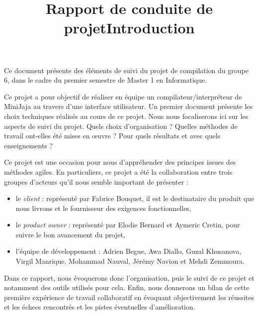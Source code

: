 \documentclass[a4paper,12pt]{article}
\title{Rapport de conduite de projet\linebreak Introduction}
\begin{document}
\maketitle

Ce document présente des éléments de suivi du projet de compilation du groupe 6, dans le cadre du premier semestre de Master 1 en Informatique. 

Ce projet a pour objectif de réaliser en équipe un compilateur/interpréteur de MiniJaja au travers d'une interface utilisateur. Un premier document présente les choix techniques réalisés au cours de ce projet. Nous nous focaliserons ici sur les aspects de suivi du projet. Quels choix d'organisation ? Quelles méthodes de travail ont-elles été mises en œuvre ? Pour quels résultats et avec quels enseignements ?

Ce projet est une occasion pour nous d'appréhender des principes issues des méthodes agiles. En particuliers, ce projet a été la collaboration entre trois groupes d'acteurs qu'il nous semble important de présenter :
\begin{itemize}
\item le \emph{client} : représenté par Fabrice Bouquet, il est le destinataire du produit que nous livrons et le fournisseur des exigences fonctionnelles,
\item le \emph{product owner} : représenté par Elodie Bernard et Aymeric Cretin, pour suivre le bon avancement du projet,
\item l'équipe de développement : Adrien Begue, Awa Diallo, Guzal Khusanova, Virgil Manrique, Mohammad Nauval, Jérémy Navion et Mehdi Zemmoura.
\end{itemize} 

\medbreak

Dans ce rapport, nous évoquerons donc l'organisation, puis le suivi de ce projet et notamment des outils utilisés pour cela. Enfin, nous donnerons un bilan de cette première expérience de travail collaboratif en évoquant objectivement les réussites et les échecs rencontrés et les pistes éventuelles d'amélioration. 
\end{document}
